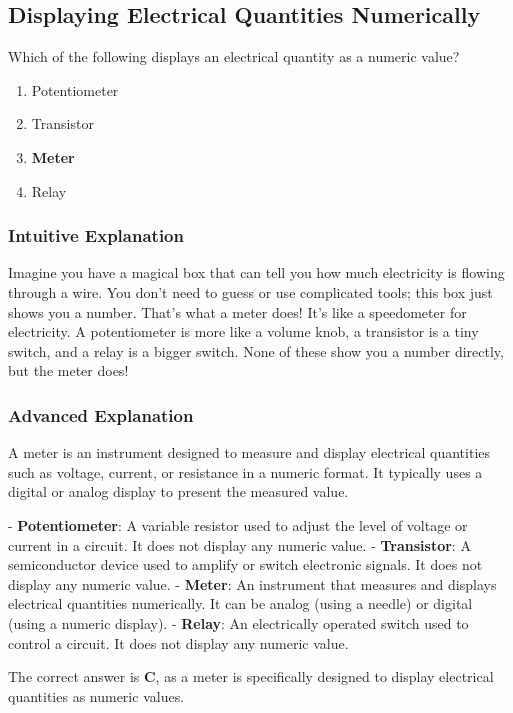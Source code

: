 \subsection{Displaying Electrical Quantities Numerically}
\label{T6D04}

\begin{tcolorbox}[colback=gray!10!white,colframe=black!75!black,title=T6D04]
Which of the following displays an electrical quantity as a numeric value?
\begin{enumerate}[label=\Alph*)]
    \item Potentiometer
    \item Transistor
    \item \textbf{Meter}
    \item Relay
\end{enumerate}
\end{tcolorbox}

\subsubsection*{Intuitive Explanation}
Imagine you have a magical box that can tell you how much electricity is flowing through a wire. You don’t need to guess or use complicated tools; this box just shows you a number. That’s what a meter does! It’s like a speedometer for electricity. A potentiometer is more like a volume knob, a transistor is a tiny switch, and a relay is a bigger switch. None of these show you a number directly, but the meter does!

\subsubsection*{Advanced Explanation}
A meter is an instrument designed to measure and display electrical quantities such as voltage, current, or resistance in a numeric format. It typically uses a digital or analog display to present the measured value. 

- \textbf{Potentiometer}: A variable resistor used to adjust the level of voltage or current in a circuit. It does not display any numeric value.
- \textbf{Transistor}: A semiconductor device used to amplify or switch electronic signals. It does not display any numeric value.
- \textbf{Meter}: An instrument that measures and displays electrical quantities numerically. It can be analog (using a needle) or digital (using a numeric display).
- \textbf{Relay}: An electrically operated switch used to control a circuit. It does not display any numeric value.

The correct answer is \textbf{C}, as a meter is specifically designed to display electrical quantities as numeric values.

